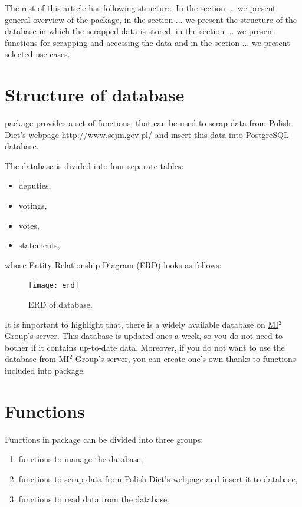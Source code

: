 The rest of this article has following structure. In the section ... we present general overview of the package, in the section ... we present the structure of the database in which the scrapped data is stored, in the section ... we present functions for scrapping and accessing the data and in the section ... we present selected use cases.



\section{Structure of database}

 package provides a set of functions, that can be used to scrap data from Polish Diet's webpage \url{http://www.sejm.gov.pl/} and insert this data into PostgreSQL database.

The database is divided into four separate tables:

\begin{itemize}
\item deputies,
\item votings,
\item votes,
\item statements,
\end{itemize}

whose Entity Relationship Diagram (ERD) looks as follows:

\begin{figure}[htbp]
  \centering
  \texttt{[image: erd]}
  \caption{ERD of database.}
  \label{figure:erd}
\end{figure}

It is important to highlight that, there is a widely available database on \href{http://mi2.mini.pw.edu.pl}{MI$^2$ Group's} server. This database is updated ones a week, so you do not need to bother if it contains up-to-date data. Moreover, if you do not want to use the database from \href{http://mi2.mini.pw.edu.pl}{MI$^2$ Group's} server, you can create one's own thanks to functions included into  package.

\section{Functions}

Functions in  package can be divided into three groups:

\begin{enumerate}
\item functions to manage the database,
\item functions to scrap data from Polish Diet's webpage and insert it to database,
\item functions to read data from the database.
\end{enumerate}


